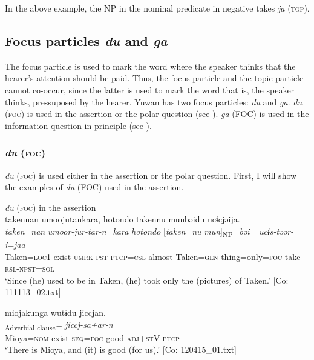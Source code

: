 In the above example, the NP in the nominal predicate in negative takes \textit{ja} (\textsc{top}).

\subsection{Focus particles \textit{du} and \textit{ga}}\label{sec:10.1.2}

The focus particle is used to mark the word where the speaker thinks that the hearer’s attention should be paid. Thus, the focus particle and the topic particle cannot co-occur, since the latter is used to mark the word that is, the speaker thinks, pressuposed by the hearer. Yuwan has two focus particles: \textit{du} and \textit{ga}. \textit{du} (\textsc{foc}) is used in the assertion or the polar question (see ). \textit{ga} (FOC) is used in the information question in principle (see ).

\subsubsection{\textit{du} (\textsc{foc})}\label{sec:10.1.2.1}

\textit{du} (\textsc{foc}) is used either in the assertion or the polar question. First, I will show the examples of \textit{du} (FOC) used in the assertion.

\ea\label{ex:10.9}   \textit{du} (\textsc{foc}) in the assertion\\
  \ea  %
      \glll    takennan  umoojutankara,  {\textbar}hotondo{\textbar}  takennu   munbəidu  ucɨcjəija.\\
      \textit{taken=nan}  \textit{umoor-jur-tar-n=kara}  \textit{hotondo}  [\textit{taken=nu} \textit{mun}]\textsubscript{NP}\textit{=bəi=}  \textit{ucɨs-təər-i=jaa}\\
      Taken=\textsc{loc}1  exist-\textsc{umrk}-\textsc{pst}-\textsc{ptcp}=\textsc{csl}  almost  Taken=\textsc{gen}   thing=only=\textsc{foc}  take-\textsc{rsl}-\textsc{npst}=\textsc{sol}\\
      \glt       ‘Since (he) used to be in Taken, (he) took only the (pictures) of Taken.’ [Co: 111113\_02.txt]

  \ex  %
      \glll    miojakunga  wutɨdu  jiccjan.\\
      [\textit{miojakun=ga}  \textit{wur-tɨ}]\textsubscript{Adverbial clause}\textit{=}  \textit{jiccj-sa+ar-n}\\
      Mioya=\textsc{nom}  exist-\textsc{seq}=\textsc{foc}  good-\textsc{adj}+\textsc{st}V-\textsc{ptcp}\\
      \glt       ‘There is Mioya, and (it) is good (for us).’ [Co: 120415\_01.txt]

